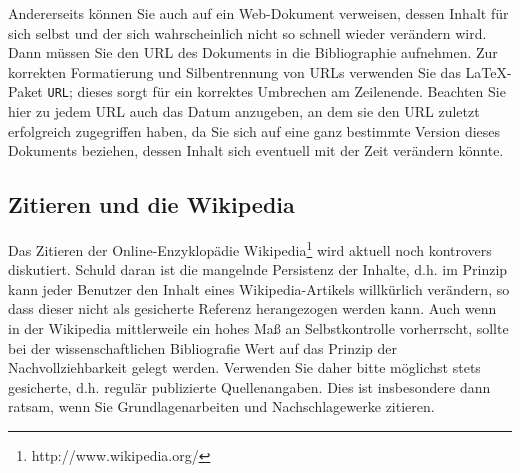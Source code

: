 Andererseits können Sie auch auf ein Web-Dokument verweisen, dessen Inhalt für sich selbst und der sich wahrscheinlich nicht so schnell wieder verändern wird.
Dann müssen Sie den URL des Dokuments in die Bibliographie aufnehmen.
Zur korrekten Formatierung und Silbentrennung von URLs verwenden Sie das \LaTeX-Paket {\tt URL}; dieses sorgt für ein korrektes Umbrechen am Zeilenende.
Beachten Sie hier zu jedem URL auch das Datum anzugeben, an dem sie den URL zuletzt erfolgreich zugegriffen haben, da Sie sich auf eine ganz bestimmte Version dieses Dokuments beziehen, dessen Inhalt sich eventuell mit der Zeit verändern könnte.


\subsection{Zitieren und die Wikipedia}
Das Zitieren der Online-Enzyklopädie Wikipedia\footnote{http://www.wikipedia.org/} wird aktuell noch kontrovers diskutiert.
Schuld daran ist die mangelnde Persistenz der Inhalte, d.h. im Prinzip kann jeder Benutzer den Inhalt eines Wikipedia-Artikels willkürlich verändern, so dass dieser nicht als gesicherte Referenz herangezogen werden kann.
Auch wenn in der Wikipedia mittlerweile ein hohes Maß an Selbstkontrolle vorherrscht, sollte bei der wissenschaftlichen Bibliografie Wert auf das Prinzip der Nachvollziehbarkeit gelegt werden.
Verwenden Sie daher bitte möglichst stets gesicherte, d.h. regulär publizierte Quellenangaben.
Dies ist insbesondere dann ratsam, wenn Sie Grundlagenarbeiten und Nachschlagewerke zitieren.


